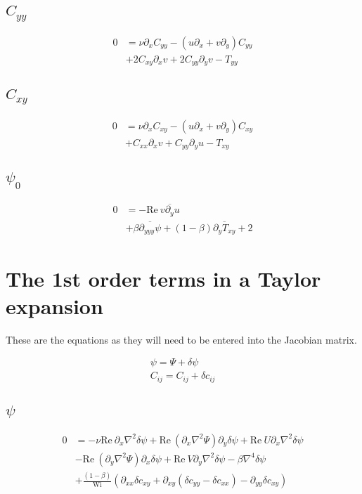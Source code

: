 \documentclass[12,a4paper]{article}
\newcommand{\dd}[1]{\partial_{#1}}
\newcommand{\lpl}{\nabla^{2}}
\newcommand{\bih}{\nabla^{4}}
\newcommand{\scij}{\delta c_{ij}}
\newcommand{\scxx}{\delta c_{xx}}
\newcommand{\scyy}{\delta c_{yy}}
\newcommand{\scxy}{\delta c_{xy}}
\newcommand{\spsi}{\delta \psi}
\newcommand{\Wi}{\mathrm{Wi}}
\newcommand{\Rey}{\mathrm{Re \ }}
\begin{document}
\subsection{$C_{yy}$}

\begin{align}
    0 &= \nu \dd{x} C_{yy} - (u\dd{x} + v\dd{y}) C_{yy} \nonumber\\
    &+ 2C_{xy} \dd{x}v + 2C_{yy}\dd{y}v - T_{yy}
\end{align}

\subsection{$C_{xy}$}

\begin{align}
    0 &= \nu \dd{x} C_{xy} - (u\dd{x} + v\dd{y}) C_{xy} \nonumber\\
    &+ C_{xx} \dd{x}v + C_{yy}\dd{y}u - T_{xy}
\end{align}

\subsection{$\psi_{0}$}

\begin{align}
    0 &= - \Rey \overline{v\dd{y}u} \nonumber\\
    &+ \beta \overline{\dd{yyy}\psi} + (1-\beta)\overline{\dd{y}T_{xy}} + 2
\end{align}

\section{The 1st order terms in a Taylor expansion}

These are the equations as they will need to be entered into the Jacobian matrix.

\begin{align}
\psi = \Psi + \spsi \\
C_{ij} = C_{ij} +\scij
\end{align}

\subsection{$\psi$}

\begin{align}
    0 &= - \nu\Rey\dd{x}\lpl\spsi +  \Rey (\dd{x}\lpl\Psi) \dd{y}\spsi + \Rey U \dd{x}\lpl \spsi \nonumber\\
    &- \Rey (\dd{y}\lpl \Psi) \dd{x} \spsi + \Rey V \dd{y} \lpl \spsi - \beta \bih \spsi \nonumber\\
    &+ \frac{(1-\beta)}{\Wi} \left( \dd{xx} \scxy +\dd{xy} (\scyy -\scxx) - \dd{yy} \scxy \right)
\end{align}
\end{document}
